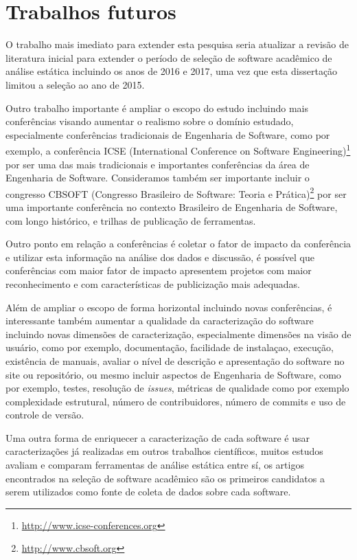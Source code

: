 \section{Trabalhos futuros}

O trabalho mais imediato para extender esta pesquisa seria atualizar a revisão
de literatura inicial para extender o período de seleção de software acadêmico
de análise estática incluindo os anos de 2016 e 2017, uma vez que esta
dissertação limitou a seleção ao ano de 2015.

Outro trabalho importante é ampliar o escopo do estudo incluindo mais
conferências visando aumentar o realismo sobre o domínio estudado,
especialmente conferências tradicionais de Engenharia de Software, como por
exemplo, a conferência ICSE (International Conference on Software
Engineering)\footnote{\url{http://www.icse-conferences.org}} por ser uma das
mais tradicionais e importantes conferências da área de Engenharia de Software.
Consideramos também ser importante incluir o congresso CBSOFT (Congresso
Brasileiro de Software: Teoria e Prática)\footnote{\url{http://www.cbsoft.org}}
por ser uma importante conferência no contexto Brasileiro de Engenharia de
Software, com longo histórico, e trilhas de publicação de ferramentas.

Outro ponto em relação a conferências é coletar o fator de impacto da
conferência e utilizar esta informação na análise dos dados e discussão, é
possível que conferências com maior fator de impacto apresentem projetos com
maior reconhecimento e com características de publicização mais adequadas.

Além de ampliar o escopo de forma horizontal incluindo novas conferências, é
interessante também aumentar a qualidade da caracterização do software
incluindo novas dimensões de caracterização, especialmente dimensões na visão
de usuário, como por exemplo, documentação, facilidade de instalaçao, execução,
existência de manuais, avaliar o nível de descrição e apresentação do software
no site ou repositório, ou mesmo incluir aspectos de Engenharia de Software,
como por exemplo, testes, resolução de {\it issues}, métricas de qualidade como
por exemplo complexidade estrutural, número de contribuidores, número de
commits e uso de controle de versão.


Uma outra forma de enriquecer a caracterização de cada software é usar
caracterizações já realizadas em outros trabalhos científicos, muitos estudos
avaliam e comparam ferramentas de análise estática entre sí, os artigos
encontrados na seleção de software acadêmico são os primeiros candidatos a
serem utilizados como fonte de coleta de dados sobre cada software.


